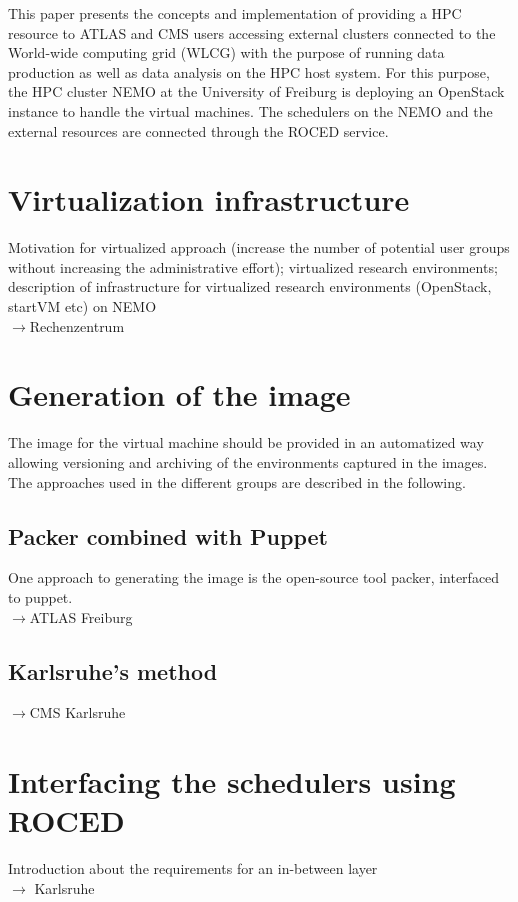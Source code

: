 This paper presents the concepts and implementation of providing a HPC
resource to ATLAS and CMS users accessing external clusters connected
to the World-wide computing grid (WLCG) with the purpose of running
data production as well as data analysis on the HPC host system.
For this purpose, the HPC cluster NEMO at the University of Freiburg
is deploying an OpenStack instance to handle the virtual machines.
The schedulers on the NEMO and the external resources are connected
through the ROCED service\cite{ROCED}.


\section{Virtualization infrastructure}
\label{sec:openstack}
Motivation for virtualized approach (increase the number of potential
user groups without increasing the administrative effort); virtualized
research environments; description of infrastructure for virtualized research environments
(OpenStack, startVM etc) on NEMO \\$\to$Rechenzentrum


\section{Generation of the image}

The image for the virtual machine should be provided in an automatized
way allowing versioning and archiving of the environments captured in
the images. The approaches used in the
different groups are described in the following.

\subsection{Packer combined with Puppet}
One approach to generating the image is the open-source tool
packer\cite{packer}, interfaced to puppet\cite{puppet}.
\\ 
$\to$ATLAS Freiburg
\subsection{Karlsruhe's method}
$\to$CMS Karlsruhe

\section{Interfacing the schedulers using ROCED}
Introduction about the requirements for an in-between layer
\\$\to $ Karlsruhe
